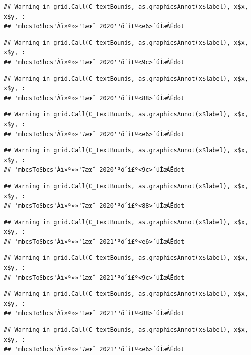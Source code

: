 \documentclass[
]{book}
\begin{document}
\begin{verbatim}
## Warning in grid.Call(C_textBounds, as.graphicsAnnot(x$label), x$x, x$y, :
## 'mbcsToSbcs'Àï×ª»»'1æœˆ 2020'³ö´í£º<e6>´úÌæÁËdot
\end{verbatim}

\begin{verbatim}
## Warning in grid.Call(C_textBounds, as.graphicsAnnot(x$label), x$x, x$y, :
## 'mbcsToSbcs'Àï×ª»»'1æœˆ 2020'³ö´í£º<9c>´úÌæÁËdot
\end{verbatim}

\begin{verbatim}
## Warning in grid.Call(C_textBounds, as.graphicsAnnot(x$label), x$x, x$y, :
## 'mbcsToSbcs'Àï×ª»»'1æœˆ 2020'³ö´í£º<88>´úÌæÁËdot
\end{verbatim}

\begin{verbatim}
## Warning in grid.Call(C_textBounds, as.graphicsAnnot(x$label), x$x, x$y, :
## 'mbcsToSbcs'Àï×ª»»'7æœˆ 2020'³ö´í£º<e6>´úÌæÁËdot
\end{verbatim}

\begin{verbatim}
## Warning in grid.Call(C_textBounds, as.graphicsAnnot(x$label), x$x, x$y, :
## 'mbcsToSbcs'Àï×ª»»'7æœˆ 2020'³ö´í£º<9c>´úÌæÁËdot
\end{verbatim}

\begin{verbatim}
## Warning in grid.Call(C_textBounds, as.graphicsAnnot(x$label), x$x, x$y, :
## 'mbcsToSbcs'Àï×ª»»'7æœˆ 2020'³ö´í£º<88>´úÌæÁËdot
\end{verbatim}

\begin{verbatim}
## Warning in grid.Call(C_textBounds, as.graphicsAnnot(x$label), x$x, x$y, :
## 'mbcsToSbcs'Àï×ª»»'1æœˆ 2021'³ö´í£º<e6>´úÌæÁËdot
\end{verbatim}

\begin{verbatim}
## Warning in grid.Call(C_textBounds, as.graphicsAnnot(x$label), x$x, x$y, :
## 'mbcsToSbcs'Àï×ª»»'1æœˆ 2021'³ö´í£º<9c>´úÌæÁËdot
\end{verbatim}

\begin{verbatim}
## Warning in grid.Call(C_textBounds, as.graphicsAnnot(x$label), x$x, x$y, :
## 'mbcsToSbcs'Àï×ª»»'1æœˆ 2021'³ö´í£º<88>´úÌæÁËdot
\end{verbatim}

\begin{verbatim}
## Warning in grid.Call(C_textBounds, as.graphicsAnnot(x$label), x$x, x$y, :
## 'mbcsToSbcs'Àï×ª»»'7æœˆ 2021'³ö´í£º<e6>´úÌæÁËdot
\end{verbatim}
\end{document}
